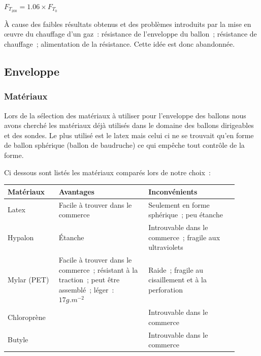 \documentclass[a4paper,11pt]{article}
\begin{document}
$F_{T_{200}} = 1.06 \times F_{T_0}$

À cause des faibles résultats obtenus et des problèmes introduits par la mise en œuvre du chauffage d'un gaz~: résistance de l'enveloppe du ballon~; résistance de chauffage~; alimentation de la résistance. Cette idée est donc abandonnée.

\subsection{Enveloppe}

\subsubsection{Matériaux}

Lors de la sélection des matériaux à utiliser pour l'enveloppe des ballons nous avons cherché les matériaux déjà utilisés dans le domaine des ballons dirigeables et des sondes. Le plus utilisé est le latex mais celui ci ne se trouvait qu'en forme de ballon sphérique (ballon de baudruche) ce qui empêche tout contrôle de la forme.

Ci dessous sont listés les matériaux comparés lors de notre choix~:

\begin{center}
\begin{tabular}{|p{0.2\linewidth}|p{0.35\linewidth}|p{0.35\linewidth}|}
		\hline
		Matériaux & Avantages & Inconvénients \\
		\hline

		\rowcolor{OrangeT}
		Latex &
		Facile à trouver dans le commerce &
		Seulement en forme sphérique~; peu étanche \\
		\hline

		\rowcolor{RedT}
		Hypalon & Étanche & Introuvable dans le commerce~; fragile aux ultraviolets \\
		\hline

		\rowcolor{GreenT}
		Mylar (PET) &
		Facile à trouver dans le commerce~; résistant à la traction~; peut être assemblé~; léger~: $17 g.m^{-2}$ &
		Raide~; fragile au cisaillement et à la perforation \\
		\hline

		\rowcolor{RedT}
		Chloroprène &
		& Introuvable dans le commerce \\
		\hline

		\rowcolor{RedT}
		Butyle &
		& Introuvable dans le commerce \\
		\hline
\end{tabular}
\end{center}
\end{document}
